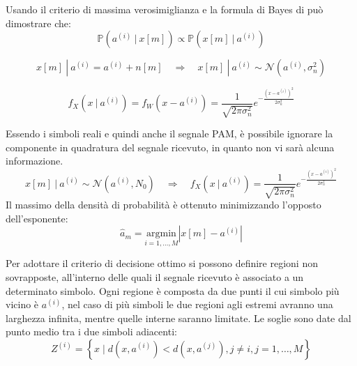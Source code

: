 Usando il criterio di massima verosimiglianza e la formula di Bayes di può dimostrare che:
\[
    \mathbb{P}(a^{(i)} \ | \ x[m]) \propto  \mathbb{P}(x[m] \ | \ a^{(i)})
\]

\[
    x[m] \ | \ a^{(i)}  = a^{(i)} + n[m] \quad \Rightarrow \quad x[m] \ | \ a^{(i)} \sim \mathcal{N}(a^{(i)}, \sigma_n^2)
\]

\[
    f_X(x \ | \ a^{(i)}) = f_{W}(x - a^{(i)}) = \frac{1}{\sqrt{2\pi \sigma_n^2}} e^{-\frac{(x - a^{(i)})^2}{2\sigma_n^2}}
\]


Essendo i simboli reali e quindi anche il segnale PAM, è possibile ignorare la componente in quadratura del segnale ricevuto, in quanto non vi sarà alcuna informazione.
\[
    x[m] \ | \ a^{(i)} \sim \mathcal{N}(a^{(i)}, N_0) \quad \Rightarrow \quad f_X(x \ | \ a^{(i)}) = \frac{1}{\sqrt{2\pi \sigma_n^2}} e^{-\frac{(x - a^{(i)})^2}{2\sigma_n^2}}
\]
Il massimo della densità di probabilità è ottenuto minimizzando l'opposto dell'esponente:
\[
    \hat{a}_m = \underset{i=1,\ldots,M}{\mathrm{argmin}} \left| x[m] - a^{(i)} \right|
\]

Per adottare il criterio di decisione ottimo si possono definire regioni non sovrapposte, all'interno delle quali il segnale ricevuto è associato a un determinato simbolo.
Ogni regione è composta da due punti il cui simbolo più vicino è $a^{(i)}$, nel caso di più simboli le due regioni agli estremi avranno una larghezza infinita, mentre quelle interne saranno limitate.
Le soglie sono date dal punto medio tra i due simboli adiacenti:
\[
    Z^{(i)} = \left\{ x \mid d(x, a^{(i)}) < d(x, a^{(j)}), j \neq i, j = 1, \ldots, M \right\}
\]


\begin{center}
    
\end{center}

\begin{center}
    
\end{center}

\begin{center}
    
\end{center}



